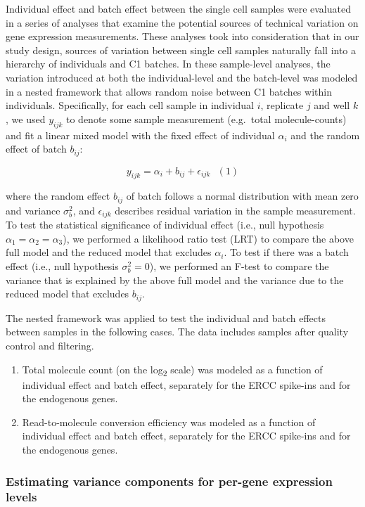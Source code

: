 Individual effect and batch effect between the single cell samples were
evaluated in a series of analyses that examine the potential sources of
technical variation on gene expression measurements. These analyses took
into consideration that in our study design, sources of variation
between single cell samples naturally fall into a hierarchy of
individuals and C1 batches. In these sample-level analyses, the
variation introduced at both the individual-level and the batch-level
was modeled in a nested framework that allows random noise between C1
batches within individuals. Specifically, for each cell sample in
individual $i$, replicate $j$ and well $k$, we used $y_{ijk}$ to denote
some sample measurement (e.g.~total molecule-counts) and fit a linear
mixed model with the fixed effect of individual $\alpha_i$ and the
random effect of batch $b_{ij}$:

\[y_{ijk} = \alpha_{i} + b_{ij} + \epsilon_{ijk} \,\,\,\,(1)\]

where the random effect $b_{ij}$ of batch follows a normal distribution
with mean zero and variance $\sigma^2_{b}$, and $\epsilon_{ijk}$
describes residual variation in the sample measurement. To test the
statistical significance of individual effect (i.e., null hypothesis
$\alpha_1 = \alpha_2 = \alpha_3$), we performed a likelihood ratio test
(LRT) to compare the above full model and the reduced model that
excludes $\alpha_i$. To test if there was a batch effect (i.e., null
hypothesis $\sigma^2_b = 0$), we performed an F-test to compare the
variance that is explained by the above full model and the variance due
to the reduced model that excludes $b_{ij}$.

The nested framework was applied to test the individual and batch
effects between samples in the following cases. The data includes
samples after quality control and filtering.

\begin{enumerate}
\def\labelenumi{\arabic{enumi}.}
\item
  Total molecule count (on the log\textsubscript{2} scale) was modeled
  as a function of individual effect and batch effect, separately for
  the ERCC spike-ins and for the endogenous genes.
\item
  Read-to-molecule conversion efficiency was modeled as a function of
  individual effect and batch effect, separately for the ERCC spike-ins
  and for the endogenous genes.
\end{enumerate}

\subsubsection{Estimating variance components for per-gene expression
levels}\label{estimating-variance-components-for-per-gene-expression-levels}

